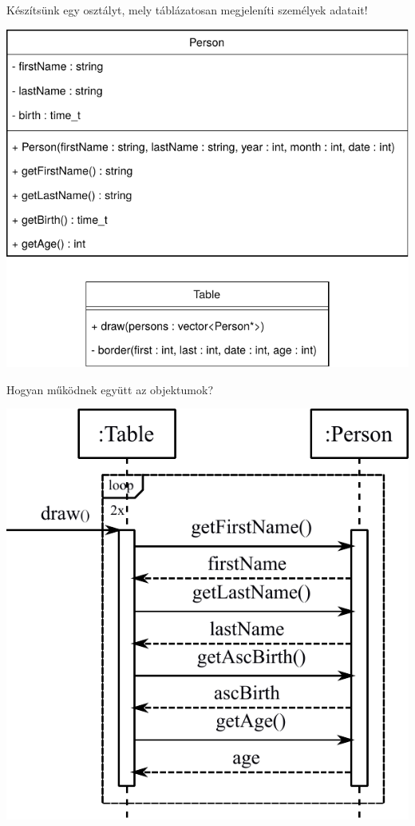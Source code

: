 \documentclass[usenames,dvipsnames,aspectratio=169]{beamer}
\begin{document}
\begin{frame}
    Készítsünk egy osztályt, mely táblázatosan megjeleníti személyek adatait!
    \begin{center}
        \includegraphics[scale=.6]{class_diagram.pdf}
    \end{center}
\end{frame}

\begin{frame}
    Hogyan működnek együtt az objektumok?
    \begin{center}
        \includegraphics[scale=.6]{sequence_diagram.pdf}
    \end{center}
\end{frame}
\end{document}
